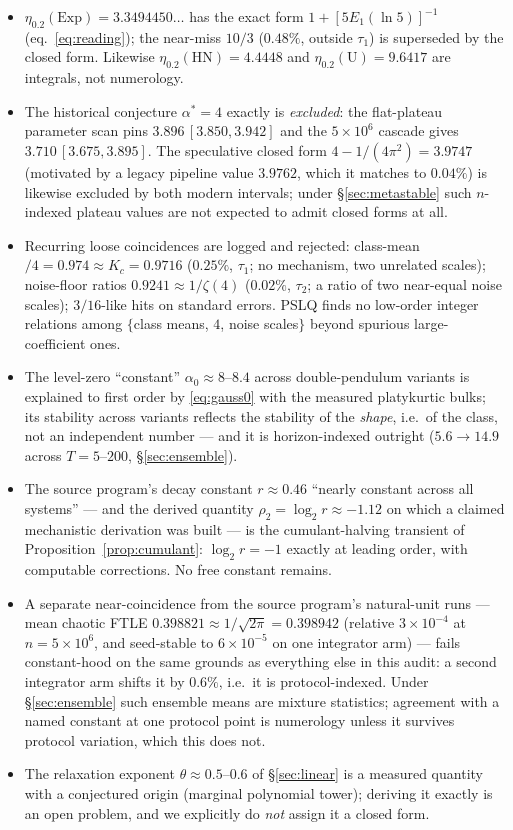 \documentclass[11pt,a4paper]{article}
\theoremstyle{remark}
\newcommand{\Exp}{\mathrm{Exp}}
\begin{document}
\begin{itemize}\itemsep2pt
\item $\eta_{0.2}(\Exp) = 3.3494450\ldots$ has the exact form $1 + [5E_1(\ln 5)]^{-1}$
(eq.~\ref{eq:reading}); the near-miss $10/3$ ($0.48\%$, outside $\tau_1$) is superseded by the
closed form. Likewise $\eta_{0.2}(\mathrm{HN}) = 4.4448$ and $\eta_{0.2}(\mathrm{U}) = 9.6417$ are
integrals, not numerology.
\item The historical conjecture $\alpha^* = 4$ exactly is \emph{excluded}: the flat-plateau
parameter scan pins $3.896\,[3.850, 3.942]$ and the $5\times10^{6}$ cascade gives
$3.710\,[3.675, 3.895]$. The speculative closed form $4 - 1/(4\pi^2) = 3.9747$ (motivated by a
legacy pipeline value $3.9762$, which it matches to $0.04\%$) is likewise excluded by both modern
intervals; under \S\ref{sec:metastable} such $n$-indexed plateau values are not expected to admit
closed forms at all.
\item Recurring loose coincidences are logged and rejected: class-mean$/4 = 0.974 \approx K_c =
0.9716$ ($0.25\%$, $\tau_1$; no mechanism, two unrelated scales); noise-floor ratios
$0.9241 \approx 1/\zeta(4)$ ($0.02\%$, $\tau_2$; a ratio of two near-equal noise scales);
$3/16$-like hits on standard errors. PSLQ finds no low-order integer relations among
$\{$class means, $4$, noise scales$\}$ beyond spurious large-coefficient ones.
\item The level-zero ``constant'' $\alpha_0 \approx 8$--$8.4$ across double-pendulum variants is
explained to first order by \eqref{eq:gauss0} with the measured platykurtic bulks; its stability
across variants reflects the stability of the \emph{shape}, i.e.\ of the class, not an independent
number --- and it is horizon-indexed outright ($5.6 \to 14.9$ across $T = 5$--$200$,
\S\ref{sec:ensemble}).
\item The source program's decay constant $r \approx 0.46$ ``nearly constant across all systems''
--- and the derived quantity $\rho_2 = \log_2 r \approx -1.12$ on which a claimed mechanistic
derivation was built --- is the cumulant-halving transient of Proposition~\ref{prop:cumulant}:
$\log_2 r = -1$ exactly at leading order, with computable corrections. No free constant remains.
\item A separate near-coincidence from the source program's natural-unit runs --- mean chaotic FTLE
$0.398821 \approx 1/\sqrt{2\pi} = 0.398942$ (relative $3\times10^{-4}$ at $n = 5\times10^{6}$, and
seed-stable to $6\times10^{-5}$ on one integrator arm) --- fails constant-hood on the same grounds
as everything else in this audit: a second integrator arm shifts it by $0.6\%$, i.e.\ it is
protocol-indexed. Under \S\ref{sec:ensemble} such ensemble means are mixture statistics; agreement
with a named constant at one protocol point is numerology unless it survives protocol variation,
which this does not.
\item The relaxation exponent $\theta \approx 0.5$--$0.6$ of \S\ref{sec:linear} is a measured
quantity with a conjectured origin (marginal polynomial tower); deriving it exactly is an open
problem, and we explicitly do \emph{not} assign it a closed form.
\end{itemize}
\end{document}
